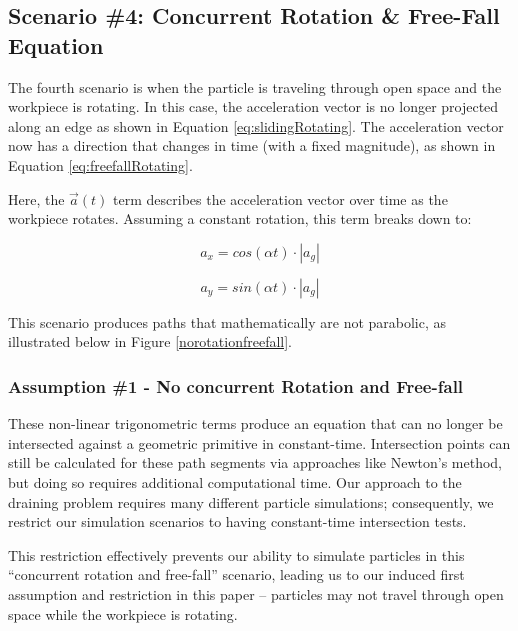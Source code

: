 		\subsection{Scenario \#4: Concurrent Rotation \& Free-Fall Equation}

The fourth scenario is when the particle is traveling through open space and the workpiece is rotating. In this case, the acceleration vector is no longer projected along an edge as shown in Equation \eqref{eq:slidingRotating}. The acceleration vector now has a direction that changes in time (with a fixed magnitude), as shown in Equation \eqref{eq:freefallRotating}.

 {
	\label{eq:freefallRotating}
}

Here, the $\vec{a}(t)$ term describes the acceleration vector over time as the workpiece rotates. Assuming a constant rotation, this term breaks down to:

$$
a_x = cos(\alpha t) \cdot |a_g|
$$

$$
a_y = sin(\alpha t) \cdot |a_g|
$$

This scenario produces paths that mathematically are not parabolic, as illustrated below in Figure \ref{norotationfreefall}.


		\subsubsection{Assumption \#1 - No concurrent Rotation and Free-fall}

These non-linear trigonometric terms produce an equation that can no longer be intersected against a geometric primitive in constant-time. Intersection points can still be calculated for these path segments via approaches like Newton's method, but doing so requires additional computational time. Our approach to the draining problem requires many different particle simulations; consequently, we restrict our simulation scenarios to having constant-time intersection tests.

This restriction effectively prevents our ability to simulate particles in this ``concurrent rotation and free-fall'' scenario, leading us to our induced first assumption and restriction in this paper -- particles may not travel through open space while the workpiece is rotating.

